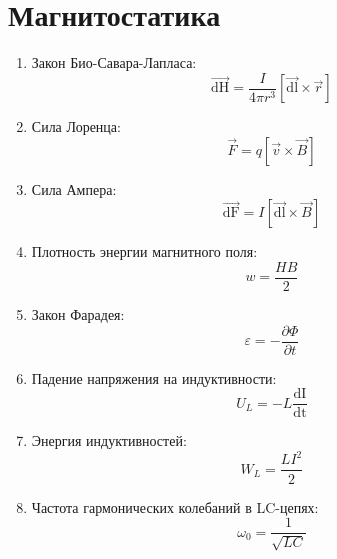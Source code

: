 	\section{Магнитостатика}
	\begin{enumerate}
		\item Закон Био-Савара-Лапласа: \[ \overrightarrow{\mathrm{dH}} = \frac{I}{4 \pi r^3} \left[ \overrightarrow{\mathrm{dl}} \times \overrightarrow{r} \right] \]
		\item Сила Лоренца: \[ \overrightarrow{F} = q \left[ \overrightarrow{v} \times \overrightarrow{B} \right] \]
		\item Сила Ампера: \[ \overrightarrow{\mathrm{dF}} = I \left[ \overrightarrow{\mathrm{dl}} \times \overrightarrow{B} \right] \]
		\item Плотность энергии магнитного поля: \[ w = \frac{HB}{2} \]
		\item Закон Фарадея: \[ \varepsilon = - \frac{\partial{\Phi}}{\partial{t}}\]
		\item Падение напряжения на индуктивности: \[ U_L = -L \frac{\mathrm{dI}}{\mathrm{dt}} \]
		\item Энергия индуктивностей: \[ W_L = \frac{LI^2}{2} \]
		\item Частота гармонических колебаний в LC-цепях: \[ \omega_0 = \frac{1}{\sqrt{LC}} \]
	\end{enumerate}
	

